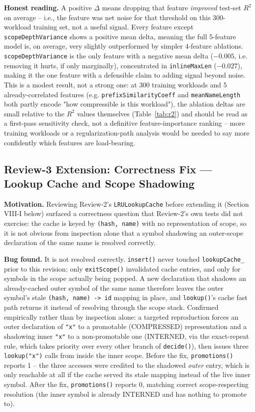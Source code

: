\documentclass[conference]{IEEEtran}
\begin{document}
\textbf{Honest reading.} A positive $\Delta$ means dropping that feature
\emph{improved} test-set $R^2$ on average -- i.e., the feature was net
noise for that threshold on this 300-workload training set, not a useful
signal. Every feature except \texttt{scopeDepthVariance} shows a positive
mean delta, meaning the full 5-feature model is, on average, very slightly
outperformed by simpler 4-feature ablations. \texttt{scopeDepthVariance} is
the only feature with a negative mean delta ($-0.005$, i.e. removing it
hurts, if only marginally), concentrated in \texttt{inlineMaxLen}
($-0.027$), making it the one feature with a defensible claim to adding
signal beyond noise. This is a modest result, not a strong one: at 300
training workloads and 5 already-correlated features (e.g.
\texttt{prefixSimilarityCoeff} and \texttt{meanNameLength} both partly
encode "how compressible is this workload"), the ablation deltas are small
relative to the $R^2$ values themselves (Table~\ref{tab:r2}) and should be
read as a first-pass sensitivity check, not a definitive feature-importance
ranking -- more training workloads or a regularization-path analysis would
be needed to say more confidently which features are load-bearing.

\subsection{Review-3 Extension: Correctness Fix --- Lookup Cache and Scope Shadowing}
\textbf{Motivation.} Reviewing Review-2's \texttt{LRULookupCache} before
extending it (Section VIII-I below) surfaced a correctness question that
Review-2's own tests did not exercise: the cache is keyed by
\texttt{(hash, name)} with no representation of scope, so it is not obvious
from inspection alone that a symbol shadowing an outer-scope declaration of
the same name is resolved correctly.

\textbf{Bug found.} It is not resolved correctly. \texttt{insert()} never
touched \texttt{lookupCache\_} prior to this revision; only
\texttt{exitScope()} invalidated cache entries, and only for symbols in the
scope actually being popped. A new declaration that shadows an
already-cached outer symbol of the same name therefore leaves the outer
symbol's stale \texttt{(hash, name) -> id} mapping in place, and
\texttt{lookup()}'s cache fast path returns it instead of resolving through
the scope stack. Confirmed empirically rather than by inspection alone: a
targeted reproduction forces an outer declaration of \texttt{"x"} to a
promotable (COMPRESSED) representation and a shadowing inner \texttt{"x"}
to a non-promotable one (INTERNED, via the exact-repeat rule, which takes
priority over every other branch of \texttt{decide()}), then issues three
\texttt{lookup("x")} calls from inside the inner scope. Before the fix,
\texttt{promotions()} reports 1 -- the three accesses were credited to the
shadowed \emph{outer} entry, which is only reachable at all if the cache
served its stale mapping instead of the live inner symbol. After the fix,
\texttt{promotions()} reports 0, matching correct scope-respecting
resolution (the inner symbol is already INTERNED and has nothing to
promote to).
\end{document}
